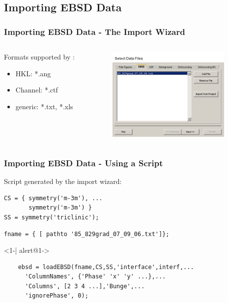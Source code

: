 \subsection*{Importing EBSD Data}
\begin{frame}[fragile]
  \frametitle{Importing EBSD Data - The Import Wizard}

  \begin{columns}

    \begin{column}{6cm}
      Formats supported by \MTEX:
      \begin{itemize}
      \item HKL: *.ang
      \item Channel: *.ctf
      \item generic: *.txt, *.xls
      \end{itemize}

    \end{column}


    \begin{column}{6cm}
      \includegraphics[width=6cm]{pic/iw2}
    \end{column}

  \end{columns}

\end{frame}


\begin{frame}[fragile]
  \frametitle{Importing EBSD Data - Using a Script}

Script generated by the import wizard:

\begin{lstlisting}
CS = { symmetry('m-3m'), ...
       symmetry('m-3m') }
SS = symmetry('triclinic');
\end{lstlisting}

\begin{lstlisting}
fname = { [ pathto '85_829grad_07_09_06.txt']};
\end{lstlisting}

\begin{actionenv}<1-| alert@1->
\begin{lstlisting}
	ebsd = loadEBSD(fname,CS,SS,'interface',interf,...
	  'ColumnNames', {'Phase' 'x' 'y' ...},...
	  'Columns', [2 3 4 ...],'Bunge',...
	  'ignorePhase', 0);
\end{lstlisting}
\end{actionenv}

\end{frame}

